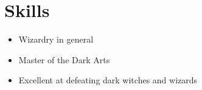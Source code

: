 \documentclass[12pt, letterpaper, twoside] {article}
\begin{document}
\section{Skills}

\begin{itemize}
    \item Wizardry in general
    \item Master of the Dark Arts
    \item Excellent at defeating dark witches and wizards 
\end{itemize}
\end{document}
